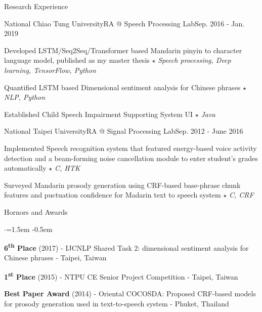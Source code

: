 \documentclass{resume_short} %
\newcommand{\ts}{\textsuperscript}
\begin{document}
\begin{rSection}{Research Experience}
    \begin{rSubsection3}{National Chiao Tung University}{RA @ Speech Processing Lab}{Sep. 2016 - Jan. 2019}
        \item Developed LSTM/Seq2Seq/Transformer based Mandarin pinyin to character language model, published as my master thesis \quad$\star$ {\em Speech processing, Deep learning, TensorFlow, Python}
        \item Quantified LSTM based Dimensional sentiment analysis for Chinese phrases \quad $\star$ {\em NLP, Python}
        \item Established Child Speech Impairment Supporting System UI \quad $\star$ {\em Java}
    \end{rSubsection3}
    \begin{rSubsection3}{National Taipei University}{RA @ Signal Processing Lab}{Sep. 2012 - June 2016}
        \item Implemented Speech recognition system that featured energy-based voice activity detection and a beam-forming noise cancellation module to enter student’s grades automatically \quad$\star$ {\em C, HTK}
        \item Surveyed Mandarin prosody generation using CRF-based base-phrase chunk features and puctuation confidence for Madarin text to speech system \quad$\star$ {\em C, CRF}
    \end{rSubsection3}
\end{rSection}


\begin{rSection}{Hornors and Awards}
    \begin{list}{$\cdot$}{\leftmargin=1.5em}
        \itemsep -0.5em \vspace{-0.25em} %
        \item {\bf 6\ts{th} Place} (2017) - IJCNLP Shared Task 2: dimensional sentiment analysis for Chinese phrases - Taipei, Taiwan
        \item {\bf 1\ts{st} Place} (2015) - NTPU CE Senior Project Competition - Taipei, Taiwan
        \item {\bf Best Paper Award} (2014) - Oriental COCOSDA: Proposed CRF-based models for prosody generation used in text-to-speech system - Phuket, Thailand
    \end{list}
\end{rSection}
\end{document}
